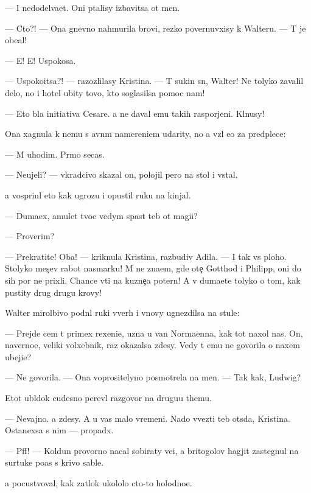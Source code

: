 \documentclass[10pt]{book}
\begin{document}
— I nedodel{\yi}va{\y}et. Oni p{\yi}talisy izbavitsa ot men{\ia}.

— Cto?! — Ona gnevno nahmurila brovi, rezko povernuvxisy k Walteru. — T{\yi} je obe{\x}al!

— E{\y}! E{\y}! Uspoko{\y}sa.

— Uspoko{\y}itsa?! — razozlilasy Kristina. — T{\yi} sukin s{\yi}n, Walter! Ne tolyko zavalil delo, no i hotel ubity tovo, kto soglasilsa pomoc nam!

— Eto b{\yi}la initiativa Cesare. {\Y}a ne daval {\y}emu takih raspor{\ia}jeni{\y}. Kl{\ia}nusy!

Ona xagnula k nemu s {\y}avn{\yi}m namereni{\y}em udarity, no {\y}a vz{\ia}l {\y}e{\y}o za predplec{\y}e:

— M{\yi} uhodim. Pr{\ia}mo se{\y}cas.

— Neujeli? — vkradcivo skazal on, polojil pero na stol i vstal.

{\Y}a vosprin{\ia}l eto kak ugrozu i opustil ruku na kinjal.

— Duma{\y}ex, amulet tvo{\y}e{\y} vedym{\yi} spas{\e}t teb{\ia} ot magi{\y}i?

— Proverim?

— Prekratite! Oba! — kriknula Kristina, razbudiv Adila. — I tak vs{\e} ploho. Stolyko mes{\ia}{\c}ev rabot{\yi} nasmarku! M{\yi} ne zna{\y}em, gde ote{\c} Gotthod i Philipp, oni do sih por ne prixli. Chance v{\yi}{\y}ti na kuzne{\c}a poter{\ia}n! A v{\yi} duma{\y}ete tolyko o tom, kak pustity drug drugu krovy!

Walter mirol{\io}bivo podn{\ia}l ruki vverh i vnovy ugnezdilsa na stule:

— Prejde cem t{\yi} primex rexeni{\y}e, uzna{\y} u van Normaenna, kak tot naxol nas. On, naverno{\y}e, veliki{\y} volxebnik, raz okazalsa zdesy. Vedy t{\yi} {\y}emu ne govorila o naxem ubeji{\x}e?

— Ne govorila. — Ona voprositelyno posmotrela na men{\ia}. — Tak kak, Ludwig?

Etot ubl{\io}dok cudesno perev{\e}l razgovor na drugu{\y}u themu.

— Nevajno. {\Y}a zdesy. A u vas malo vremeni. Nado v{\yi}vezti teb{\ia} ots{\io}da, Kristina. Ostanexsa s nim — propad{\e}x.

— Pff! — Koldun provorno nacal sobiraty ve{\x}i, a britogolov{\yi}{\y} hagjit zastegnul na surtuke po{\y}as s krivo{\y} sable{\y}.

{\Y}a pocustvoval, kak zat{\yi}lok ukololo cto-to holodno{\y}e.
\end{document}
